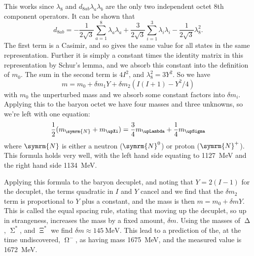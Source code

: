 \documentclass[fleqn]{NotesClass}
\newcommand{\Pomegam}{\ensuremath{\upOmega^-}}
\begin{document}
    This works since \(\lambda_8\) and \(d_{8ab}\lambda_a\lambda_b\) are the only two independent octet 8th component operators.
    It can be shown that
    \begin{equation}
        d_{8ab} = -\frac{1}{2\sqrt{3}} \sum_{a = 1}^8 \lambda_a \lambda_a + \frac{3}{2\sqrt{3}} \sum_{i = 1}^{3} \lambda_i \lambda_i - \frac{1}{2\sqrt{3}} \lambda_8^2.
    \end{equation}
    The first term is a Casimir, and so gives the same value for all states in the same representation.
    Further it is simply a constant times the identity matrix in this representation by Schur's lemma, and we absorb this constant into the definition of \(m_0\).
    The sum in the second term is \(4I^2\), and \(\lambda_8^2 = 3Y^2\).
    So we have
    \begin{equation}
        m = m_0 + \delta m_1 Y + \delta m_2 (I (I + 1) - Y^2/4)
    \end{equation}
    with \(m_0\) the unperturbed mass and we absorb some constant factors into \(\delta m_i\).
    Applying this to the baryon octet we have four masses and three unknowns, so we're left with one equation:
    \begin{equation}
        \frac{1}{2}(m_{\symrm{N}} + m_{\upXi}) = \frac{3}{4}m_{\upLambda} + \frac{1}{4}m_{\upSigma}
    \end{equation}
    where \(\symrm{N}\) is either a neutron (\(\symrm{N}^0\)) or proton (\(\symrm{N}^+\)).
    This formula holds very well, with the left hand side equating to \qty{1127}{\mega\electronvolt} and the right hand side \qty{1134}{\mega\electronvolt}.
    
    Applying this formula to the baryon decuplet, and noting that \(Y = 2(I - 1)\) for the decuplet, the terms quadratic in \(I\) and \(Y\) cancel and we find that the \(\delta m_2\) term is proportional to \(Y\) plus a constant, and the mass is then \(m = m_0 + \delta m Y\).
    This is called the equal spacing rule, stating that moving up the decuplet, so up in strangeness, increases the mass by a fixed amount, \(\delta m\).
    Using the masses of \(\upDelta\), \(\upSigma^*\), and \(\upXi^*\) we find \(\delta m \approx \qty{145}{\mega\electronvolt}\).
    This lead to a prediction of the, at the time undiscovered, \(\Pomegam\), as having mass \qty{1675}{\mega\electronvolt}, and the measured value is \qty{1672}{\mega\electronvolt}.
    
\end{document}
